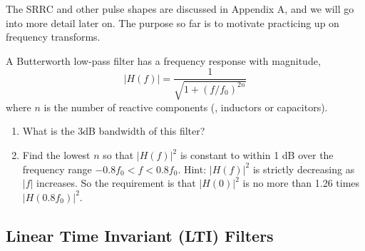 {The SRRC and other pulse shapes are discussed in Appendix A, and we will go into more detail later on.  The purpose so far is to motivate practicing up on frequency transforms. 

A Butterworth low-pass filter has a frequency response with magnitude,
\[
|H(f)| = \frac{1}{\sqrt{1 + (f/f_0)^{2n}}}
\]
where $n$ is the number of reactive components (\ie, inductors or
capacitors).
  \begin{enumerate}
    \item What is the 3dB bandwidth of this filter?
    \item Find the lowest $n$ so that $|H(f)|^2$ is constant to within 1
    dB over the frequency range $-0.8 f_0 < f < 0.8 f_0$.  Hint:
    $|H(f)|^2$ is strictly decreasing as $|f|$ increases.  So the requirement
    is that $|H(0)|^2$ is no more than 1.26 times $|H(0.8 f_0)|^2$.
  \end{enumerate}



\subsection{Linear Time Invariant (LTI) Filters}

}

